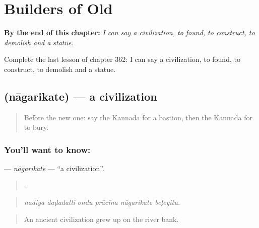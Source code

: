
\chapter{Builders of Old}
\label{ch:ka-builders-of-old}

\begin{chapteropening}
\textbf{By the end of this chapter:} \emph{I can say a civilization, to found, to construct, to demolish and a statue.}

Complete the last lesson of chapter 362: I can say a civilization, to found, to construct, to demolish and a statue.
\end{chapteropening}

\section[\texorpdfstring{\kn{ನಾಗರಿಕತೆ} (nāgarikate)}{ನಾಗರಿಕತೆ (nāgarikate)}]{ (nāgarikate) — a civilization}

\label{lesson:KA-C362-nagarikate}



\begin{quote}
Before the new one: say the Kannada for a bastion, then the Kannada for to bury.
\end{quote}

\subsection*{You'll want to know: }
\textbf{} — \emph{nāgarikate} — \textquotedblleft{}a civilization\textquotedblright{}.

\begin{quote}
     .
\end{quote}

\begin{quote}
\emph{nadiya daḍadalli ondu prācīna nāgarikate beḷeyitu.}
\end{quote}

\begin{quote}
An ancient civilization grew up on the river bank.
\end{quote}


